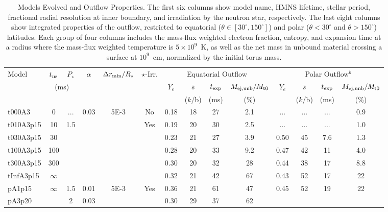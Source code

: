 \documentclass[usenatbib,fleqn]{mn2e}
\begin{document}
\begin{table}
\centering
\begin{minipage}{18cm}
\caption{Models Evolved and Outflow
Properties\label{t:models}\label{t:results}. The first
six columns show model name, HMNS lifetime, stellar period, fractional
radial resolution
at inner boundary, and irradiation by the neutron star, respectively.
The last eight columns show integrated properties of the outflow,
restricted to equatorial
 ($\theta \in [30^\circ,150^\circ]$) and polar ($\theta<30^\circ$ and
$\theta > 150^\circ$)
latitudes. Each group of four columns includes the mass-flux weighted
electron fraction, entropy,
and expansion time at a radius where the mass-flux weighted temperature is
$5\times10^9$~K, as
well as the net mass in unbound material crossing a surface at $10^9$~cm,
normalized
by the initial torus mass.}
\begin{tabular}{lccccccccccccc}
\hline
{Model}&
{$t_{\rm ns}$} &
{$P_\star$} &
{$\alpha$} &
{$\Delta r_{\rm min}/R_\star$} &
{$\star$-Irr.} &
\multicolumn{4}{c}{Equatorial Outflow} &
\multicolumn{4}{c}{Polar Outflow$^b$}\\
{ } & \multicolumn{2}{c}{(ms)} &  {}  &  {}  & {} &
{$\bar{Y}_e$} &
{$\bar{s}$ } &
{$t_{\rm exp}$} &
{$M_{\rm ej,unb}/M_{\rm t0}$} &
{$\bar{Y}_e$} &
{$\bar{s}$ } &
{$t_{\rm exp}$} &
{$M_{\rm ej,unb}/M_{\rm t0}$}\\
\multicolumn{6}{c}{} & {} & {($k$/b)} & {(ms)} & {(\%)} & {} & {($k$/b)} &
{(ms)} & {(\%)}\\
\hline
t000A3      & 0        & ... & 0.03 & 5E-3 & No   & 0.18 & 18 & 27  & 2.1
& ...  & ... & ... & 0.9 \\
t010A3p15   & 10       & 1.5 &      &      & Yes  & 0.19 & 20 & 30  & 2.5
& ...  & ... & ... & 1.0 \\
t030A3p15   & 30       &     &      &      &      & 0.23 & 21 & 27  & 3.9
& 0.50 & 45  & 7.6 & 1.3 \\
t100A3p15   & 100      &     &      &      &      & 0.28 & 20 & 33  & 9.2
& 0.47 & 42  & 11  & 4.0 \\
t300A3p15   & 300      &     &      &      &      & 0.30 & 20 & 32  & 28
& 0.44 & 38  & 17  & 8.8 \\
tInfA3p15   & $\infty$ &     &      &      &      & 0.32 & 21 & 42  & 67
& 0.43 & 52  & 17  & 22  \\
\noalign{\smallskip}
pA1p15      & $\infty$ & 1.5 & 0.01 & 5E-3 & Yes  & 0.36 & 21 & 61  & 47
& 0.45 & 52  & 19  & 22 \\
pA3p20      &          & 2   & 0.03 &      &      & 0.30 & 29 & 37  & 62

\end{tabular}
\end{minipage}
\end{table}
\end{document}
